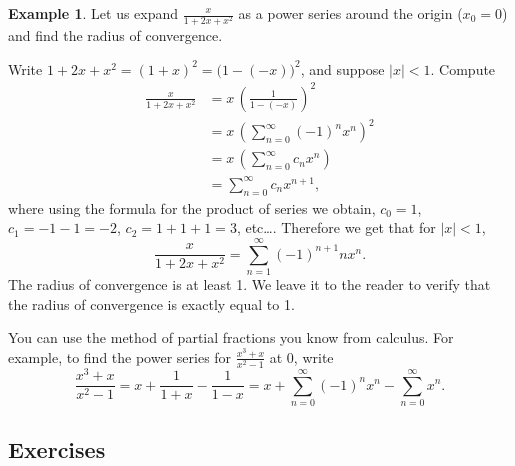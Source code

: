 \documentclass[12pt]{book}
\newcommand{\abs}[1]{\left\lvert {#1} \right\rvert}
\theoremstyle{plain}
\theoremstyle{remark}
\theoremstyle{definition}
\theoremstyle{exercise}
\newtheorem{exercise}{Exercise}[section]
\theoremstyle{example}
\newtheorem{example}[thm]{Example}
\begin{document}
\begin{example}
Let us expand $\frac{x}{1+2x+x^2}$ as a power series around the origin ($x_0 = 0$) and
find the radius of convergence.

Write $1+2x+x^2 = {(1+x)}^2 = {\bigl(1-(-x)\bigr)}^2$, and suppose
$\abs{x} < 1$.  Compute
\begin{equation*}
\begin{split}
\frac{x}{1+2x+x^2}
&=
x \,
{\left(
\frac{1}{1-(-x)}
\right)}^2
\\
&=
x \,
{\left( 
\sum_{n=0}^\infty {(-1)}^n x^n 
\right)}^2
\\
&=
x \,
\left(
\sum_{n=0}^\infty c_n x^n 
\right)
\\
&=
\sum_{n=0}^\infty c_n x^{n+1} ,
\end{split}
\end{equation*}
where using the formula for the product of series
we obtain, $c_0 = 1$, $c_1 = -1 -1 = -2$, $c_2 = 1+1+1 = 3$, etc\ldots.
Therefore we get that for $\abs{x} < 1$, 
\begin{equation*}
\frac{x}{1+2x+x^2}
=
\sum_{n=1}^\infty {(-1)}^{n+1} n x^n .
\end{equation*}
The radius of convergence is at least 1.  We leave it to the reader to
verify that the radius of convergence is exactly equal to 1.
\end{example}

You can use the method of partial fractions you know from calculus.
For example, to find the power series for $\frac{x^3+x}{x^2-1}$ at 0, write
\begin{equation*}
\frac{x^3+x}{x^2-1}
=
x + \frac{1}{1+x} - \frac{1}{1-x}
=
x + \sum_{n=0}^\infty {(-1)}^n x^n - \sum_{n=0}^\infty x^n .
\end{equation*}

\subsection{Exercises}

%
\end{document}

